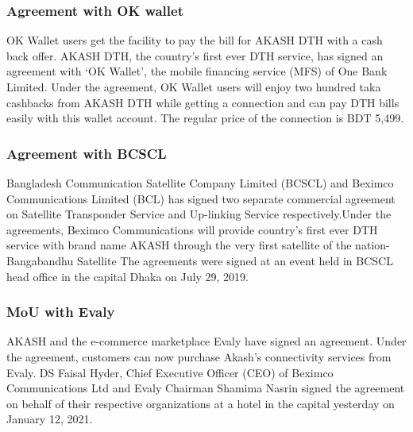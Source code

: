 \begin{spacing}{1.0}
\subsubsection{Agreement with OK wallet}
OK Wallet users get the facility to pay the bill for AKASH DTH with a cash back offer. AKASH DTH, the country's first ever DTH service, has signed an agreement with ‘OK Wallet’, the mobile financing service (MFS) of One Bank Limited. Under the agreement, OK Wallet users will enjoy two hundred taka cashbacks from AKASH DTH while getting a connection and can pay DTH bills easily with this wallet account. The regular price of the connection is BDT 5,499.
\subsubsection{Agreement with BCSCL}
Bangladesh Communication Satellite Company Limited (BCSCL) and Beximco Communications Limited (BCL) has signed two separate commercial agreement on Satellite Transponder Service and Up-linking Service respectively.Under the agreements, Beximco Communications will provide country’s first ever DTH service with brand name AKASH through the very first satellite of the nation- Bangabandhu Satellite The agreements were signed at an event held in BCSCL head office in the capital Dhaka on July 29, 2019.
\subsubsection{MoU with Evaly}
AKASH and the e-commerce marketplace Evaly have signed an agreement. Under the agreement, customers can now purchase Akash's connectivity services from Evaly. DS Faisal Hyder, Chief Executive Officer (CEO) of Beximco Communications Ltd and Evaly Chairman Shamima Nasrin signed the agreement on behalf of their respective organizations at a hotel in the capital yesterday on January 12, 2021.

\end{spacing}
